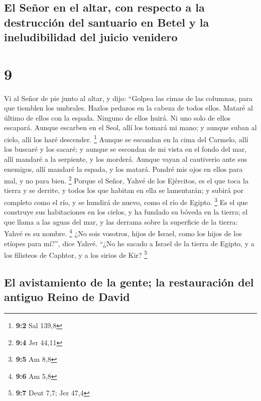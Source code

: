 \hypertarget{el-seuxf1or-en-el-altar-con-respecto-a-la-destrucciuxf3n-del-santuario-en-betel-y-la-ineludibilidad-del-juicio-venidero}{%
\subsection{El Señor en el altar, con respecto a la destrucción del
santuario en Betel y la ineludibilidad del juicio
venidero}\label{el-seuxf1or-en-el-altar-con-respecto-a-la-destrucciuxf3n-del-santuario-en-betel-y-la-ineludibilidad-del-juicio-venidero}}

\hypertarget{section-8}{%
\section{9}\label{section-8}}

 Vi al Señor de pie junto al altar, y dijo: ``Golpea las
cimas de las columnas, para que tiemblen los umbrales. Hazlos pedazos en
la cabeza de todos ellos. Mataré al último de ellos con la espada.
Ninguno de ellos huirá. Ni uno solo de ellos escapará. 
Aunque escarben en el Seol, allí los tomará mi mano; y aunque suban al
cielo, allí los haré descender. \footnote{\textbf{9:2} Sal 139,8}
 Aunque se escondan en la cima del Carmelo, allí los
buscaré y los sacaré; y aunque se escondan de mi vista en el fondo del
mar, allí mandaré a la serpiente, y los morderá.  Aunque
vayan al cautiverio ante sus enemigos, allí mandaré la espada, y los
matará. Pondré mis ojos en ellos para mal, y no para bien. \footnote{\textbf{9:4}
  Jer 44,11}  Porque el Señor, Yahvé de los Ejércitos, es
el que toca la tierra y se derrite, y todos los que habitan en ella se
lamentarán; y subirá por completo como el río, y se hundirá de nuevo,
como el río de Egipto. \footnote{\textbf{9:5} Am 8,8}  Es
el que construye sus habitaciones en los cielos, y ha fundado su bóveda
en la tierra; el que llama a las aguas del mar, y las derrama sobre la
superficie de la tierra: Yahvé es su nombre. \footnote{\textbf{9:6} Am
  5,8}  ¿No sois vosotros, hijos de Israel, como los hijos
de los etíopes para mí?'', dice Yahvé. ``¿No he sacado a Israel de la
tierra de Egipto, y a los filisteos de Caphtor, y a los sirios de Kir?
\footnote{\textbf{9:7} Deut 7,7; Jer 47,4}

\hypertarget{el-avistamiento-de-la-gente-la-restauraciuxf3n-del-antiguo-reino-de-david}{%
\subsection{El avistamiento de la gente; la restauración del antiguo
Reino de
David}\label{el-avistamiento-de-la-gente-la-restauraciuxf3n-del-antiguo-reino-de-david}}


